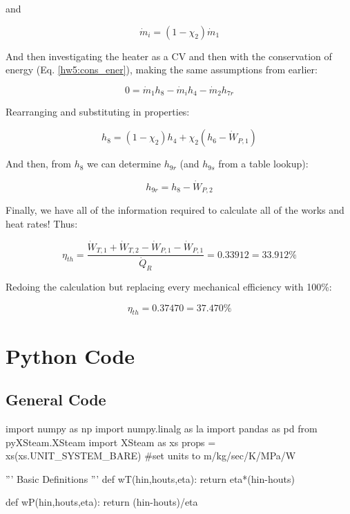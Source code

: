 \documentclass{article}
\begin{document}
and 

\begin{equation}
    \Dot{m}_i = (1 - \chi_2) \Dot{m}_1
\end{equation}

And then investigating the heater as a CV and then with the conservation of energy (Eq. \ref{hw5:cons_ener}), making the same assumptions from earlier: 

\begin{equation}
    0 = \Dot{m}_1 h_8 - \Dot{m}_i h_4 - \Dot{m}_2 h_{7r}
\end{equation}

Rearranging and substituting in properties:

\begin{equation}
    h_8 = (1-\chi_2) h_4 + \chi_2 (h_6 - \Dot{W}_{P,1}) 
\end{equation}

And then, from $h_8$ we can determine $h_{9r}$ (and $h_{9s}$ from a table lookup):

\begin{equation}
    h_{9r} = h_8 - \Dot{W}_{P,2} 
\end{equation}

Finally, we have all of the information required to calculate all of the works and heat rates! Thus:

\[
    \boxed{\eta_{th} = \frac{\Dot{W}_{T,1} + \Dot{W}_{T,2} - \Dot{W}_{P,1} - \Dot{W}_{P,1}}{\Dot{Q}_R} = 0.33912 = 33.912\%}
\]

Redoing the calculation but replacing every mechanical efficiency with 100\%:

\[
\boxed{\eta_{th} = 0.37470 = 37.470\%}
\]
\newpage
\section*{Python Code}

\subsection*{General Code}\label{sec:gen_code}


\begin{python}
    import numpy as np 
    import numpy.linalg as la
    import pandas as pd
    from pyXSteam.XSteam import XSteam as xs
    props = xs(xs.UNIT_SYSTEM_BARE) #set units to m/kg/sec/K/MPa/W

    '''
    Basic Definitions
    '''
    def wT(hin,houts,eta):
        return eta*(hin-houts)
    
    def wP(hin,houts,eta):
        return (hin-houts)/eta
\end{python}
\end{document}
